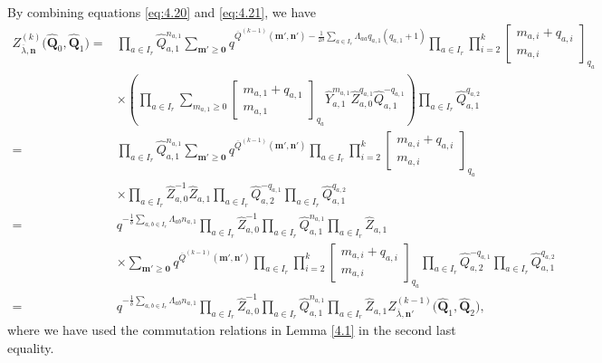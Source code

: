 \documentclass[pdftex]{sigma}
\numberwithin{equation}{section}
\begin{document}
By combining equations \eqref{eq:4.20} and \eqref{eq:4.21}, we have
\begin{align}
Z_{\overline{\lambda},\mathbf{n}}^{(k)}\bigl(\widehat{\mathbf{Q}}_0,\widehat{\mathbf{Q}}_1\bigr)
={}&\prod_{a\in I_r}\widehat{Q}_{a,1}^{n_{a,1}}\sum_{\mathbf{m}'\geq\mathbf{0}}q^{\overline{Q}^{(k-1)}(\mathbf{m}',\mathbf{n}')-\frac{1}{2\delta}\sum_{a\in I_r}\Lambda_{aa}q_{a,1}(q_{a,1}+1)}\prod_{a\in I_r}\prod_{i=2}^k\begin{bmatrix}m_{a,i}+q_{a,i}\\m_{a,i}\end{bmatrix}_{q_a}\nonumber\\
& \times\left(\prod_{a\in I_r}\sum_{m_{a,1}\geq0}\begin{bmatrix}m_{a,1}+q_{a,1}\\m_{a,1}\end{bmatrix}_{q_a}\widehat{Y}_{a,1}^{m_{a,1}}\widehat{Z}_{a,0}^{q_{a,1}}\widehat{Q}_{a,1}^{-q_{a,1}}\right)\prod_{a\in I_r}\widehat{Q}_{a,1}^{q_{a,2}}\nonumber\\
={}&\prod_{a\in I_r}\widehat{Q}_{a,1}^{n_{a,1}}\sum_{\mathbf{m}'\geq\mathbf{0}}q^{\overline{Q}^{(k-1)}(\mathbf{m}',\mathbf{n}')}\prod_{a\in I_r}\prod_{i=2}^k\begin{bmatrix}m_{a,i}+q_{a,i}\\m_{a,i}\end{bmatrix}_{q_a}\nonumber\\
& \times\prod_{a\in I_r}\widehat{Z}_{a,0}^{-1}\widehat{Z}_{a,1}\prod_{a\in I_r}\widehat{Q}_{a,2}^{-q_{a,1}}\prod_{a\in I_r}\widehat{Q}_{a,1}^{q_{a,2}}\nonumber\\
={}&q^{-\frac{1}{\delta}\sum_{a,b\in I_r}\Lambda_{ab}n_{a,1}}\prod_{a\in I_r}\widehat{Z}_{a,0}^{-1}\prod_{a\in I_r}\widehat{Q}_{a,1}^{n_{a,1}}\prod_{a\in I_r}\widehat{Z}_{a,1}\nonumber\\
& \times\sum_{\mathbf{m}'\geq\mathbf{0}}q^{\overline{Q}^{(k-1)}(\mathbf{m}',\mathbf{n}')}\prod_{a\in I_r}\prod_{i=2}^k\begin{bmatrix}m_{a,i}+q_{a,i}\\m_{a,i}\end{bmatrix}_{q_a}\prod_{a\in I_r}\widehat{Q}_{a,2}^{-q_{a,1}}\prod_{a\in I_r}\widehat{Q}_{a,1}^{q_{a,2}}\nonumber\\
={}&q^{-\frac{1}{\delta}\sum_{a,b\in I_r}\Lambda_{ab}n_{a,1}}\prod_{a\in I_r}\widehat{Z}_{a,0}^{-1}\prod_{a\in I_r}\widehat{Q}_{a,1}^{n_{a,1}}\prod_{a\in I_r}\widehat{Z}_{a,1}Z_{\overline{\lambda},\mathbf{n}'}^{(k-1)}\bigl(\widehat{\mathbf{Q}}_1,\widehat{\mathbf{Q}}_2\bigr)\label{eq:4.22},
\end{align}
where we have used the commutation relations in Lemma \ref{4.1} in the second last equality.
\end{document}
